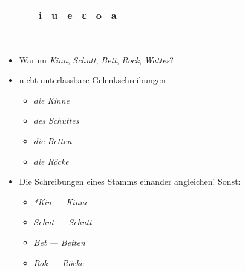 \begin{frame}
{\begin{tabular}{lllllllll}
      \midrule
      & & & \textbf{i} & \textbf{u} & \textbf{e} & \textbf{ε} & \textbf{o} & \textbf{a} \\

      \bottomrule
    \end{tabular}
  }\\
  \pause
  \Viertelzeile
  \raggedright
  \begin{itemize}[<+->]
    \item Warum \textit{Kinn}, \textit{Schutt}, \textit{Bett}, \textit{Rock}, \textit{Wattes}?
    \item \alert{nicht unterlassbare Gelenkschreibungen}
      \begin{itemize}[<+->]
        \item \textit{die Ki\alert{nn}e}
        \item \textit{des Schu\alert{tt}es}
        \item \textit{die Be\alert{tt}en}
        \item \textit{die Rö\alert{ck}e}
      \end{itemize}
    \item \alert{Die Schreibungen eines Stamms einander angleichen!} Sonst:
      \begin{itemize}[<+->]
        \item \textit{*Kin --- Kinne}
        \item \textit{Schut --- Schutt}
        \item \textit{Bet --- Betten}
        \item \textit{Rok --- Röcke}
      \end{itemize}
  \end{itemize}
\end{frame}

